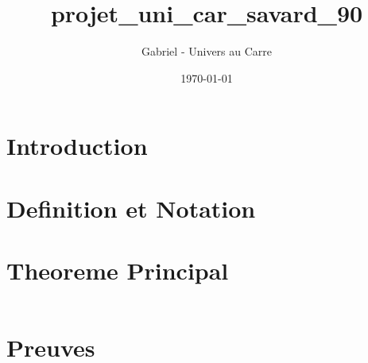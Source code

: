 \documentclass[12pt]{article}
\title{projet_uni_car_savard_90}
\author{Gabriel - Univers au Carre}
\date{\today}
\begin{document}
\maketitle


\section{Introduction}



\section{Definition et Notation}



\section{Theoreme Principal}


\begin{equation}
\end{equation}


\section{Preuves}


\end{document}
